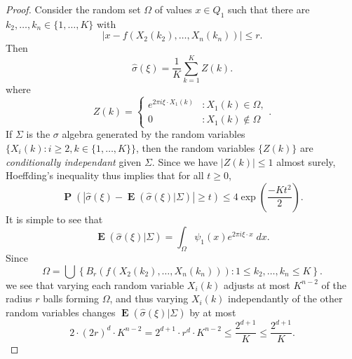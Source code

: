 \documentclass[12pt,reqno]{article}
\numberwithin{equation}{section}
\numberwithin{theorem}{section}
\DeclareMathOperator{\EE}{\mathbf{E}}
\DeclareMathOperator{\PP}{\mathbf{P}}
\begin{document}
\begin{proof}
    Consider the random set $\Omega$ of values $x \in Q_1$ such that there are $k_2,\dots,k_n \in \{ 1,\dots,K \}$ with
    \begin{equation}
        |x - f(X_2(k_2),\dots,X_n(k_n))| \leq r.
    \end{equation}
    Then
    \begin{equation}
        \widehat{\sigma}(\xi) = \frac{1}{K} \sum_{k = 1}^K Z(k).
    \end{equation}
    where
    \begin{equation}
        Z(k) = \begin{cases} e^{2 \pi i \xi \cdot X_1(k)} &: X_1(k) \in \Omega, \\ 0 &: X_1(k) \not \in \Omega \end{cases}.
    \end{equation}
    If $\Sigma$ is the $\sigma$ algebra generated by the random variables $\{ X_i(k) : i \geq 2, k \in \{ 1, \dots, K \} \}$, then the random variables $\{ Z(k) \}$ are \emph{conditionally independant} given $\Sigma$. Since we have $|Z(k)| \leq 1$ almost surely, Hoeffding's inequality thus implies that for all $t \geq 0$,
    \begin{equation} \label{equationCOIJCOIJX1232312}
        \PP \left( \left| \widehat{\sigma}(\xi) - \EE(\widehat{\sigma}(\xi)|\Sigma) \right| \geq t \right) \leq 4 \exp \left( \frac{-K t^2}{2} \right).
    \end{equation}
    It is simple to see that
    \begin{equation}
        \EE(\widehat{\sigma}(\xi) | \Sigma) = \int_\Omega \psi_1(x) e^{2 \pi i \xi \cdot x}\; dx.
    \end{equation}
    Since
    \begin{equation}
        \Omega = \bigcup \left\{ B_r(f(X_2(k_2),\dots,X_n(k_n))) : 1 \leq k_2,\dots,k_n \leq K \right\}.
    \end{equation}
    we see that varying each random variable $X_i(k)$ adjusts at most $K^{n-2}$ of the radius $r$ balls forming $\Omega$, and thus varying $X_i(k)$ independantly of the other random variables changes $\EE(\widehat{\sigma}(\xi)|\Sigma)$ by at most
    \begin{equation}
        2 \cdot (2r)^d \cdot K^{n-2} = 2^{d+1} \cdot r^d \cdot K^{n-2} \leq \frac{2^{d+1}}{K} \leq \frac{2^{d+1}}{K}.
    \end{equation}

\end{proof}
\end{document}
